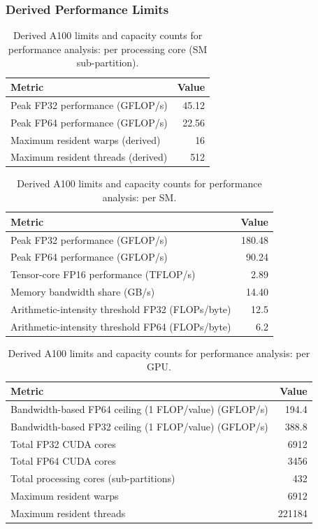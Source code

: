 \subsubsection{Derived Performance Limits}

\begin{table}[H]
\centering
\caption{Derived A100 limits and capacity counts for performance analysis:
  per processing core (SM sub-partition).}
\label{tab:a100-derived-core}
\begin{tabularx}{\textwidth}{X r}
\toprule
Metric & Value \\
\midrule
Peak FP32 performance (GFLOP/s) & \num{45.12} \\
Peak FP64 performance (GFLOP/s) & \num{22.56} \\
Maximum resident warps (derived) & \num{16} \\
Maximum resident threads (derived) & \num{512} \\
\bottomrule
\end{tabularx}
\end{table}

\begin{table}[H]
\centering
\caption{Derived A100 limits and capacity counts for performance analysis:
  per SM.}
\label{tab:a100-derived}
\begin{tabularx}{\textwidth}{X r}
\toprule
Metric & Value \\
\midrule
Peak FP32 performance (GFLOP/s) & \num{180.48} \\
Peak FP64 performance (GFLOP/s) & \num{90.24} \\
Tensor-core FP16 performance (TFLOP/s) & \num{2.89} \\
Memory bandwidth share (GB/s) & \num{14.40} \\
Arithmetic-intensity threshold FP32 (FLOPs/byte) & \num{12.5} \\
Arithmetic-intensity threshold FP64 (FLOPs/byte) & \num{6.2} \\
\bottomrule
\end{tabularx}
\end{table}

\begin{table}[H]
\centering
\caption{Derived A100 limits and capacity counts for performance analysis:
  per GPU.}
\label{tab:a100-derived-gpu}
\begin{tabularx}{\textwidth}{X r}
\toprule
Metric & Value \\
\midrule
Bandwidth-based FP64 ceiling (1 FLOP/value) (GFLOP/s) & \num{194.4} \\
Bandwidth-based FP32 ceiling (1 FLOP/value) (GFLOP/s) & \num{388.8} \\
Total FP32 CUDA cores & \num{6912} \\
Total FP64 CUDA cores & \num{3456} \\
Total processing cores (sub-partitions) & \num{432} \\
Maximum resident warps & \num{6912} \\
Maximum resident threads & \num{221184} \\
\bottomrule
\end{tabularx}
\end{table}


